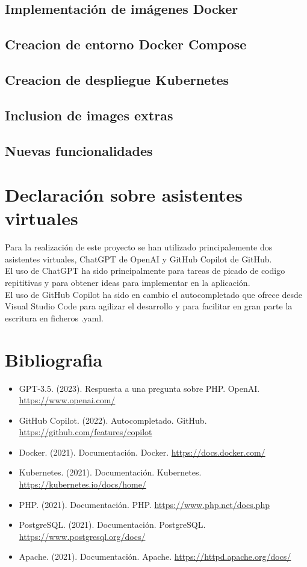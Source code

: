 \documentclass{report}
\begin{document}
        \section{Implementación de imágenes Docker}
            
        \clearpage
        \section{Creacion de entorno Docker Compose}
        \clearpage
        \section{Creacion de despliegue Kubernetes}
        \clearpage
        \section{Inclusion de images extras}
        \clearpage
        \section{Nuevas funcionalidades}
    \chapter{Declaración sobre asistentes virtuales}
        Para la realización de este proyecto se han utilizado principalemente dos asistentes virtuales, ChatGPT de OpenAI y GitHub Copilot de GitHub.\\

        El uso de ChatGPT ha sido principalmente para tareas de picado de codigo repititivas y para obtener ideas para implementar en la aplicación.\\

        El uso de GitHub Copilot ha sido en cambio el autocompletado que ofrece desde Visual Studio Code para agilizar el desarrollo y para facilitar en gran parte la escritura en ficheros .yaml.\\
    \chapter{Bibliografia}
    \begin{itemize}
        \item GPT-3.5. (2023). Respuesta a una pregunta sobre PHP. OpenAI. \url{https://www.openai.com/}
        \item GitHub Copilot. (2022). Autocompletado. GitHub. \url{https://github.com/features/copilot}
        \item Docker. (2021). Documentación. Docker. \url{https://docs.docker.com/}
        \item Kubernetes. (2021). Documentación. Kubernetes. \url{https://kubernetes.io/docs/home/}
        \item PHP. (2021). Documentación. PHP. \url{https://www.php.net/docs.php}
        \item PostgreSQL. (2021). Documentación. PostgreSQL. \url{https://www.postgresql.org/docs/}
        \item Apache. (2021). Documentación. Apache. \url{https://httpd.apache.org/docs/}
    \end{itemize}
\end{document}
